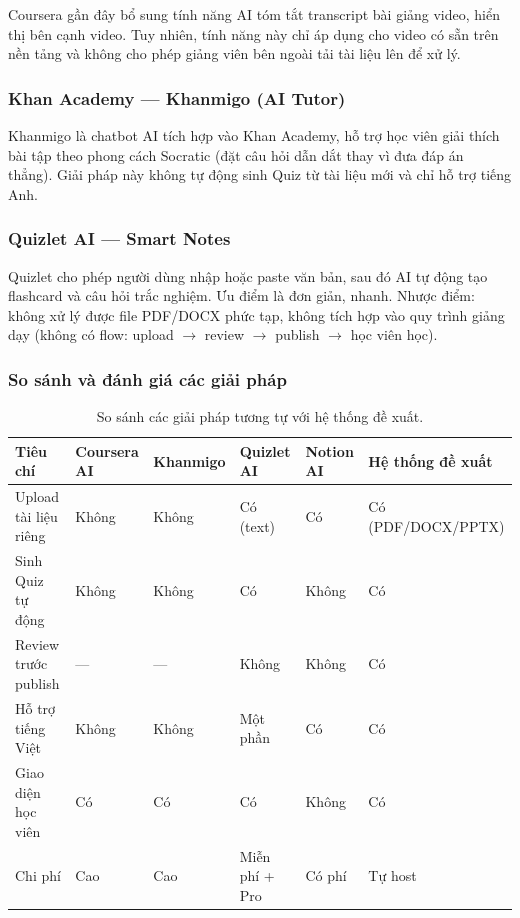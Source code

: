 Coursera gần đây bổ sung tính năng AI tóm tắt transcript bài giảng video,
hiển thị bên cạnh video. Tuy nhiên, tính năng này chỉ áp dụng cho video có
sẵn trên nền tảng và không cho phép giảng viên bên ngoài tải tài liệu lên để
xử lý.

\subsubsection{Khan Academy --- Khanmigo (AI Tutor)}

Khanmigo là chatbot AI tích hợp vào Khan Academy, hỗ trợ học viên giải thích
bài tập theo phong cách Socratic (đặt câu hỏi dẫn dắt thay vì đưa đáp án
thẳng). Giải pháp này không tự động sinh Quiz từ tài liệu mới và chỉ hỗ trợ
tiếng Anh.

\subsubsection{Quizlet AI --- Smart Notes}

Quizlet cho phép người dùng nhập hoặc paste văn bản, sau đó AI tự động tạo
flashcard và câu hỏi trắc nghiệm. Ưu điểm là đơn giản, nhanh. Nhược điểm:
không xử lý được file PDF/DOCX phức tạp, không tích hợp vào quy trình giảng
dạy (không có flow: upload $\to$ review $\to$ publish $\to$ học viên học).

\subsubsection{So sánh và đánh giá các giải pháp}

\begin{table}[H]
    \centering
    \caption{So sánh các giải pháp tương tự với hệ thống đề xuất.}
    \label{tab:compare-solutions}
    \begin{tabular}{p{3cm}p{2cm}p{2cm}p{2cm}p{2cm}p{3.5cm}}
        \toprule
        \textbf{Tiêu chí} & \textbf{Coursera AI} & \textbf{Khanmigo} &
        \textbf{Quizlet AI} & \textbf{Notion AI} & \textbf{Hệ thống đề xuất} \\
        \midrule
        Upload tài liệu riêng  & Không & Không & Có (text) & Có & Có (PDF/DOCX/PPTX) \\
        Sinh Quiz tự động       & Không & Không & Có        & Không & Có \\
        Review trước publish    & ---   & ---   & Không     & Không & Có \\
        Hỗ trợ tiếng Việt       & Không & Không & Một phần  & Có    & Có \\
        Giao diện học viên      & Có    & Có    & Có        & Không & Có \\
        Chi phí                 & Cao   & Cao   & Miễn phí + Pro & Có phí & Tự host \\
        \bottomrule
    \end{tabular}
\end{table}

